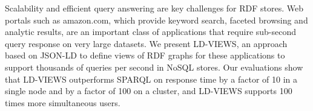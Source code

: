 Scalability and efficient query answering are key challenges for RDF stores.
Web portals such as amazon.com, which provide keyword search, faceted browsing and analytic results, are an important class of applications that require sub-second query response on very large datasets.
We present LD-VIEWS, an approach based on JSON-LD to define views of RDF graphs for these applications to support thousands of queries per second in NoSQL stores.
Our evaluations show that LD-VIEWS outperforms SPARQL on response time by a factor of 10 in a single node and by a factor of 100 on a cluster, and LD-VIEWS supports 100 times more simultaneous users.

